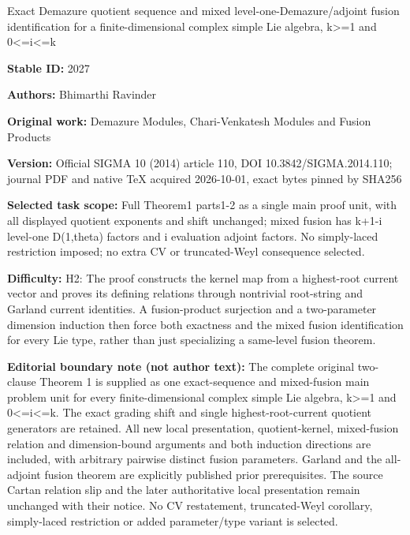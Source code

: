 \documentclass[11pt]{article}
\numberwithin{equation}{section}
\begin{document}
\begin{center}\Large Exact Demazure quotient sequence and mixed level-one-Demazure/adjoint fusion identification for a finite-dimensional complex simple Lie algebra, k>=\allowbreak{}1 and 0<=\allowbreak{}i<=\allowbreak{}k\end{center}
\noindent\textbf{Stable ID:} 2027\par
\noindent\textbf{Authors:} Bhimarthi Ravinder\par
\noindent\textbf{Original work:} Demazure Modules, Chari-Venkatesh Modules and Fusion Products\par
\noindent\textbf{Version:} Official SIGMA 10 (2014) article 110, DOI 10.3842/SIGMA.2014.110; journal PDF and native TeX acquired 2026-10-01, exact bytes pinned by SHA256\par
\noindent\textbf{Selected task scope:} Full Theorem1 parts1-2 as a single main proof unit, with all displayed quotient exponents and shift unchanged; mixed fusion has k+\allowbreak{}1-i level-one D(1,theta) factors and i evaluation adjoint factors. No simply-laced restriction imposed; no extra CV or truncated-Weyl consequence selected.\par
\noindent\textbf{Difficulty:} H2: The proof constructs the kernel map from a highest-root current vector and proves its defining relations through nontrivial root-string and Garland current identities. A fusion-product surjection and a two-parameter dimension induction then force both exactness and the mixed fusion identification for every Lie type, rather than just specializing a same-level fusion theorem.\par
\noindent\textbf{Editorial boundary note (not author text):} The complete original two-clause Theorem 1 is supplied as one exact-sequence and mixed-fusion main problem unit for every finite-dimensional complex simple Lie algebra, k>=\allowbreak{}1 and 0<=\allowbreak{}i<=\allowbreak{}k. The exact grading shift and single highest-root-current quotient generators are retained. All new local presentation, quotient-kernel, mixed-fusion relation and dimension-bound arguments and both induction directions are included, with arbitrary pairwise distinct fusion parameters. Garland and the all-adjoint fusion theorem are explicitly published prior prerequisites. The source Cartan relation slip and the later authoritative local presentation remain unchanged with their notice. No CV restatement, truncated-Weyl corollary, simply-laced restriction or added parameter/type variant is selected.\par
\end{document}
